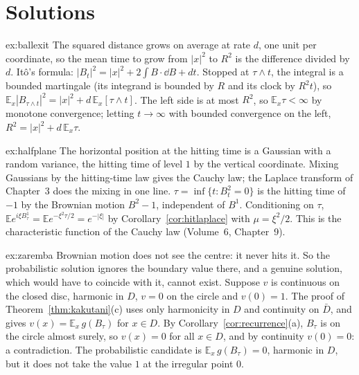 \section{Solutions}

\begin{solution}{ex:ballexit}
\idea The squared distance grows on average at rate $d$, one unit per coordinate, so the mean time to grow from $|x|^2$ to $R^2$ is the difference divided by $d$.
\writeup It\^o's formula: $|B_t|^2=|x|^2+2\int B\cdot\dd B+dt$. Stopped at $\tau\wedge t$, the integral is a bounded martingale (its integrand is bounded by $R$ and its clock by $R^2t$), so $\mathbb E_x|B_{\tau\wedge t}|^2=|x|^2+d\,\mathbb E_x[\tau\wedge t]$.
The left side is at most $R^2$, so $\mathbb E_x\tau<\infty$ by monotone convergence; letting $t\to\infty$ with bounded convergence on the left, $R^2=|x|^2+d\,\mathbb E_x\tau$.
\end{solution}

\begin{solution}{ex:halfplane}
\idea The horizontal position at the hitting time is a Gaussian with a random variance, the hitting time of level $1$ by the vertical coordinate. Mixing Gaussians by the hitting-time law gives the Cauchy law; the
Laplace transform of Chapter~3 does the mixing in one line.
\writeup $\tau=\inf\{t:B^2_t=0\}$ is the hitting time of $-1$ by the Brownian motion $B^2-1$, independent of $B^1$. Conditioning on $\tau$, $\mathbb Ee^{i\xi B^1_\tau}=\mathbb Ee^{-\xi^2\tau/2}=e^{-|\xi|}$ by Corollary~\ref{cor:hitlaplace} with
$\mu=\xi^2/2$. This is the characteristic function of the Cauchy law (Volume~6, Chapter~9).
\end{solution}

\begin{solution}{ex:zaremba}
\idea Brownian motion does not see the centre: it never hits it. So the probabilistic solution ignores the boundary value there, and a genuine solution, which would have to coincide with it, cannot exist.
\writeup Suppose $v$ is continuous on the closed disc, harmonic in $D$, $v=0$ on the circle and $v(0)=1$. The proof of Theorem~\ref{thm:kakutani}(c) uses only harmonicity in $D$ and continuity on $\bar D$, and gives
$v(x)=\mathbb E_x\,g(B_\tau)$ for $x\in D$. By Corollary~\ref{cor:recurrence}(a), $B_\tau$ is on the circle almost surely, so $v(x)=0$ for all $x\in D$, and by continuity $v(0)=0$: a contradiction. The probabilistic candidate is
$\mathbb E_x\,g(B_\tau)=0$, harmonic in $D$, but it does not take the value $1$ at the irregular point $0$.
\end{solution}

